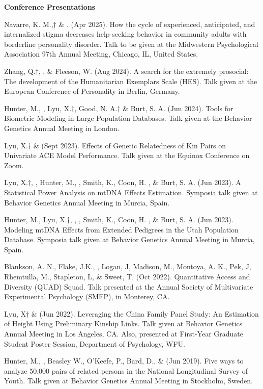 {\large {\bf Conference Presentations}}
\begin{etaremune}

\item Navarre, K. M.,$\dagger$ \& \meb. (Apr 2025). How the cycle of experienced, anticipated, and internalized stigma decreases help-seeking behavior in community adults with borderline personality disorder. Talk to be given at the Midwestern Psychological Association 97th Annual Meeting, Chicago, IL, United States.
\item Zhang, Q.$\dagger$, \meb, \&  Fleeson, W. (Aug 2024). A search for the extremely prosocial: The development of the Humanitarian Exemplars Scale (HES). Talk given at the European Conference of Personality in Berlin, Germany.
\item Hunter, M., \meb, Lyu, X.$\dagger$, Good, N. A.$\dagger$ \& Burt, S. A. (Jun 2024). Tools for Biometric Modeling in Large Population Databases. Talk given at the Behavior Genetics Annual Meeting in London.
\item Lyu, X.$\dagger$ \& \meb (Sept 2023). Effects of Genetic Relatedness of Kin Pairs on Univariate ACE Model Performance. Talk given at the Equinox Conference on Zoom.
\item Lyu, X.$\dagger$, \meb, Hunter, M.,  \Joe, Smith, K., Coon, H. , \& Burt, S. A. (Jun 2023). A Statistical Power Analysis on mtDNA Effects Estimation. Symposia talk given at Behavior Genetics Annual Meeting in Murcia, Spain.
\item Hunter, M., Lyu, X.$\dagger$, \meb,  \Joe, Smith, K., Coon, H. , \& Burt, S. A. (Jun 2023). Modeling mtDNA Effects from Extended Pedigrees in the Utah Population Database. Symposia talk given at Behavior Genetics Annual Meeting in Murcia, Spain.
\item  Blankson, A. N., Flake, J.K., \meb, Logan, J, Madison, M., Montoya, A. K., Pek, J, Rhemtulla, M., Stapleton, L, \& Sweet, T. (Oct 2022). Quantitative Access and Diversity (QUAD) Squad. Talk presented at the Annual Society of Multivariate Experimental Psychology (SMEP), in Monterey, CA.
\item Lyu, X$\dagger$ \& \meb (Jun 2022). Leveraging the China Family Panel Study: An Estimation of Height Using Preliminary Kinship Links. Talk given at Behavior Genetics Annual Meeting in Los Angeles, CA. Also, presented at First-Year Graduate Student Poster Session, Department of Psychology, WFU.
%
\item Hunter, M., \meb, Beasley W., O'Keefe, P.,  Bard, D., \& \Joe (Jun 2019). Five ways to analyze 50,000 pairs of related persons in the National Longitudinal Survey of Youth. Talk given at Behavior Genetics Annual Meeting in Stockholm, Sweden. 

\end{etaremune}
